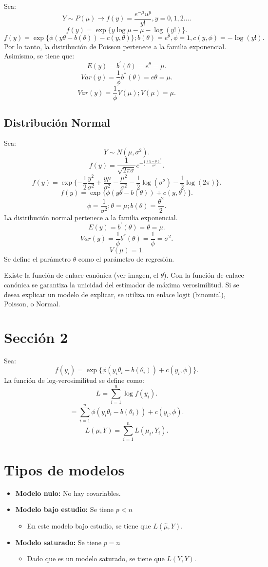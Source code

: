 \documentclass{article}
\begin{document}
Sea:
\[ Y\sim P(\mu) \rightarrow f{(y)}=\frac{e^{-\mu}u^{y}}{y!}, y=0,1,2\ldots.\]
\[ f{(y)}=\exp\{y\log \mu - \mu - \log{(y!)}\}.\]
\[ f{(y)}=\exp\{\phi{(y\theta-b{(\theta)})}-c{(y,\theta)}\}; b{(\theta)}=e^{\theta}, \phi=1,c{(y,\phi)}=-\log{(y!)}.\]
Por lo tanto, la distribución de Poisson pertenece a la familia exponencial. Asimismo, se tiene que:
\[ E{(y)}=b^{'}{(\theta)}=e^{\theta}=\mu.\]
\[ Var{(y)}=\frac{1}{\phi}b^{''}{(\theta)}=e\theta=\mu.\]
\[ Var{(y)}=\frac{1}{\phi}V{(\mu)}; V{(\mu)}=\mu.\]

\subsection{Distribución Normal}
Sea:
\[ Y\sim N{(\mu,\sigma^{2})}.\]
\[ f{(y)}=\frac{1}{\sqrt{2\pi\sigma}}e^{-\frac{1}{2}\frac{{(y-\mu)}^{2}}{\sigma^{2}}}.\]
\[ f{(y)}=\exp\{-\frac{1}{2}\frac{y^{2}}{\sigma^{2}}+\frac{y\mu}{\sigma^{2}}-\frac{\mu^{2}}{\sigma^{2}}-\frac{1}{2}\log{(\sigma^{2})}-\frac{1}{2}\log{(2\pi)}\}.\]
\[ f{(y)}=\exp\{\phi{(y\theta-b{(\theta)})}+c{(y,\theta)}\}.\]
\[ \phi=\frac{1}{\sigma^{2}}; \theta=\mu; b{(\theta)}=\frac{\theta^{2}}{2}.\]
La distribución normal pertenece a la familia exponencial.
\[ E{(y)}=b^{'}{(\theta)}=\theta=\mu.\]
\[ Var(y)=\frac{1}{\phi}b^{''}{(\theta)}=\frac{1}{\phi}=\sigma^{2}.\]
\[ V{(\mu)}=1.\]
Se define el parámetro $\theta$ como el parámetro de regresión.

Existe la función de enlace canónica (ver imagen, el $\theta$). Con la función de enlace canónica se garantiza la unicidad del estimador de máxima verosimilitud. Si se desea explicar un modelo de explicar, se utiliza un enlace logit (binomial), Poisson, o Normal.

\section{Sección 2}
Sea:
\[ f{(y_{i})}=\exp\{\phi{(y_{i}\theta_{i}-b{(\theta_{i})})}+c{(y_{i},\phi)}\}.\]
La función de log-verosimilitud se define como:
\[ L = \sum_{i=1}^{n}\log f{(y_{i})}.\]
\[ =\sum_{i=1}^{n} \phi{(y_{i}\theta_{i}-b{(\theta_{i})})}+c{(y_{i},\phi)}.\]
\[ L{(\mu,Y)}=\sum_{i=1}^{n}L{(\mu_{i},Y_{i})}.\]

\section{Tipos de modelos}
\begin{itemize}
	\item \textbf{Modelo nulo: }No hay covariables.
	\item \textbf{Modelo bajo estudio: } Se tiene $p<n$
		\begin{itemize}
			\item En este modelo bajo estudio, se tiene que $L(\hat{\mu},Y)$.
		\end{itemize}
	\item \textbf{Modelo saturado: }Se tiene $p=n$
		\begin{itemize}
			\item Dado que es un modelo saturado, se tiene que $L(Y,Y)$.
		\end{itemize}
\end{itemize}
\end{document}
